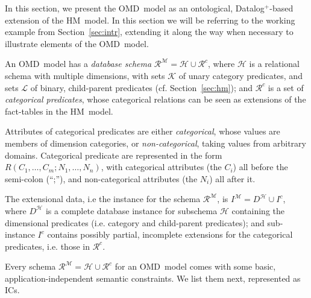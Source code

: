 \documentclass[format=acmsmall, review=false, screen=true]{acmart}
\newcommand{\mc}[1]{\mathcal{ #1}}
\newcommand{\schema}{\mc{R}}
\newcommand{\dplus}{{Datalog}$^+$}
\newcommand{\omd}{OMD}
\newcommand{\hm}{HM}
\newcommand{\blue}[1]{{#1}}
\newcommand{\comlb}[1]{{\vspace{2mm}\noindent \bf \blue{COMM(LEO):}}~ #1 \hfill {\bf
    END.}\\}
\newcommand{\commos}[1]{{\vspace{2mm}\noindent \bf \blue{COMM(MOSTAFA):}}~ #1 \hfill {\bf
    END.}\\}
\begin{document}
In this section, we present the \omd \ model as an ontological, \dplus-based extension of the \hm \ model.  In this section we will be referring to the working example from Section~\ref{sec:intr}, extending it along the way when necessary to illustrate elements of the \omd \ model.




An \omd \ model has a  {\em database schema}  $\schema^\mc{M}=\mc{H} \cup \mc{R}^c$, where $\mc{H}$ is a relational schema with multiple dimensions, with sets $\mc{K}$ of unary category predicates,  and sets $\mc{L}$ of binary, child-parent predicates (cf. Section~\ref{sec:hm}); and $\mc{R}^c$ is a set of {\em categorical predicates}, whose categorical relations can be seen as extensions of  the fact-tables in the \hm \ model.


Attributes of categorical predicates are either {\em categorical}, whose values are members of dimension categories, or {\em non-categorical}, taking values from arbitrary domains. Categorical predicate are represented in the form  $R(C_1,\ldots,C_m;N_1, \ldots, N_n)$, with categorical attributes (the $C_i$) all before the semi-colon (``;''), and non-categorical attributes (the $N_i$) all after it.

The extensional data, i.e the instance for the schema $\schema^\mc{M}$, is $I^\mc{M}=D^\mc{H}\cup I^c$, where $D^\mc{H}$ is a complete database instance for subschema $\mc{H}$ containing the dimensional predicates (i.e. category and child-parent predicates); and  sub-instance $I^c$ contains possibly partial, incomplete extensions for the categorical predicates, i.e. those in $\mc{R}^c$.

Every schema $\schema^\mc{M}=\mc{H} \cup \mc{R}^c$ for an \omd \ model comes with some basic, application-independent semantic constraints. We list them next, represented as ICs.
\end{document}

